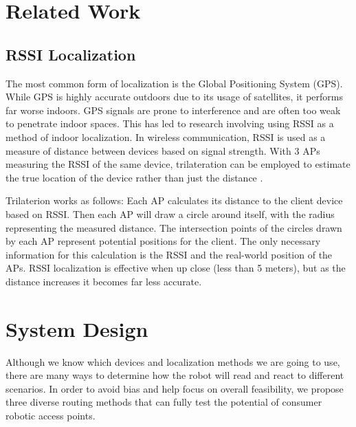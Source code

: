 \section{Related Work}
\subsection{RSSI Localization}
The most common form of localization is the Global Positioning System (GPS). While GPS is highly accurate outdoors due to its usage of satellites, it performs far worse indoors. GPS signals are prone to interference and are often too weak to penetrate indoor spaces.  This has led to research involving using RSSI as a method of indoor localization. In wireless communication, RSSI is used as a measure of distance between devices based on signal strength. With 3 APs measuring the RSSI of the same device, trilateration can be employed to estimate the true location of the device rather than just the distance \cite{rssiLocalization}.

Trilaterion works as follows: Each AP calculates its distance to the client device based on RSSI. Then each AP will draw a circle around itself, with the radius representing the measured distance. The intersection points of the circles drawn by each AP represent potential positions for the client. The only necessary information for this calculation is the RSSI and the real-world position of the APs. RSSI localization is effective when up close (less than 5 meters), but as the distance increases it becomes far less accurate. 



\section{System Design}
Although we know which devices and localization methods we are going to use, there are many ways to determine how the robot will read and react to different scenarios. In order to avoid bias and help focus on overall feasibility, we propose three diverse routing methods that can fully test the potential of consumer robotic access points.

